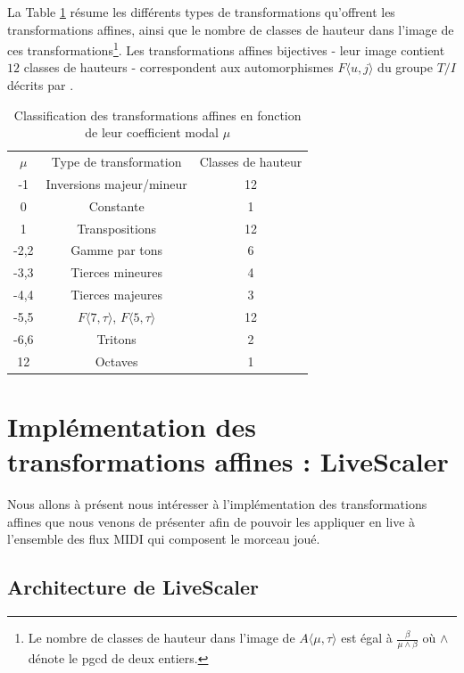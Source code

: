 \documentclass{article}
\begin{document}
La Table \ref{tab:classmu} résume les différents types de transformations qu'offrent les transformations affines, ainsi que le nombre de classes de hauteur dans l'image de ces transformations\footnote{Le nombre de classes de hauteur dans l'image de $A\langle \mu, \tau\rangle$ est égal à $\frac{\beta}{\mu\wedge \beta}$ où $\wedge$ dénote le pgcd de deux entiers.}. Les transformations affines bijectives - leur image contient $12$ classes de hauteurs - correspondent  aux automorphismes $F\langle u,j \rangle$ du groupe $T/I$ décrits par \cite{lewin1990klumpenhouwer}.


\begin{table}[htbp]
  \centering
  \begin{tabular}{ccc}
    \rowcolor{gray!50}
    $\mu$ & Type de transformation & Classes de hauteur\\
    -1 & Inversions majeur/mineur & 12\\
    0 & Constante & 1\\
    1 & Transpositions & 12 \\
    -2,2 & Gamme par tons & 6 \\
    -3,3 & Tierces mineures &4 \\
    -4,4 & Tierces majeures & 3\\
    -5,5 & $F\langle 7,\tau \rangle$, $F\langle 5,\tau \rangle$& 12 \\
    -6,6 & Tritons & 2\\
    12 & Octaves & 1
  \end{tabular}
  \caption{Classification des transformations affines en fonction de leur coefficient modal $\mu$\label{tab:classmu} }
\end{table}



\section{Implémentation des transformations affines : LiveScaler}

Nous allons à présent nous intéresser à l'implémentation des transformations affines que nous venons de présenter afin de pouvoir les appliquer en live à l'ensemble des flux MIDI qui composent le morceau joué.

\subsection{Architecture de LiveScaler}
\end{document}
